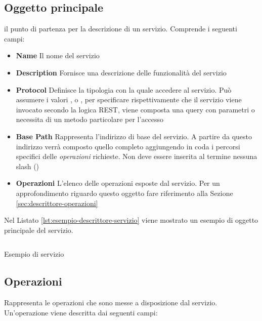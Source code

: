 \subsection{Oggetto principale\label{sec:oggetto-principale-servizi}}

\upe il punto di partenza per la descrizione di un servizio. Comprende i seguenti campi:

\begin{itemize}
	\item \textbf{Name}
	Il nome del servizio
	\item \textbf{Description}
	Fornisce una descrizione delle funzionalità del servizio
	\item \textbf{Protocol}
	Definisce la tipologia con la quale accedere al servizio. Può assumere i valori ,  o , per specificare rispettivamente che il servizio viene invocato secondo la logica REST, viene composta una query con parametri o necessita di un metodo particolare per l'accesso
	\item \textbf{Base Path}
	Rappresenta l'indirizzo di base del servizio. A partire da questo indirizzo verrà composto quello completo aggiungendo in coda i percorsi specifici delle \emph{operazioni} richieste. Non deve essere inserita al termine nessuna slash (\virgolette{/})
	\item \textbf{Operazioni}
	L'elenco delle operazioni esposte dal servizio. Per un approfondimento riguardo questo oggetto fare riferimento alla Sezione \ref{sec:descrittore-operazioni}
\end{itemize}

Nel Listato \ref{lst:esempio-descrittore-servizio} viene mostrato un esempio di oggetto principale del servizio.

\begin{listing}[H]
	\inputminted{json}{5-implementazione-backend/Codice/esempio_descrittore_servizio.json}
	\caption{Esempio di servizio}
	\label{lst:esempio-descrittore-servizio}
\end{listing}

\subsection{Operazioni\label{sec:descrittore-operazioni}}

Rappresenta le operazioni che sono messe a disposizione dal servizio. Un'operazione viene descritta dai seguenti campi:


